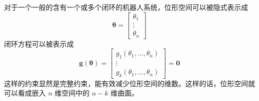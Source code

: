 对于一个一般的含有一个或多个闭环的机器人系统，位形空间可以被隐式表示成
\begin{equation}
	\label{eq:位形与速度约束:位形向量}
	\boldsymbol{\theta}=\begin{bmatrix}
		\theta_{1}\\
		\vdots\\
		\theta_{n}
	\end{bmatrix}
\end{equation}
闭环方程可以被表示成
\begin{equation}
	\label{eq:位形与速度约束:闭环方程向量形式}
	\boldsymbol{g}(\boldsymbol{\theta})=\begin{bmatrix}
		g_{1}(\theta_{1},\ldots,\theta_{n})\\
		\vdots\\
		g_{k}(\theta_{1},\ldots,\theta_{n})
	\end{bmatrix}=\boldsymbol{0}
\end{equation}
这样的约束显然是完整约束，能有效减少位形空间的维数。这样的话，位形空间就可以看成嵌入 $n$ 维空间中的 $n-k$ 维曲面。

